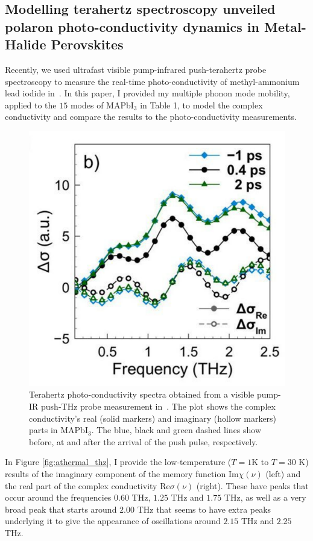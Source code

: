 \subsection{Modelling terahertz spectroscopy unveiled polaron photo-conductivity dynamics in Metal-Halide Perovskites}

Recently, we used ultrafast visible pump-infrared push-terahertz probe spectroscopy to measure the real-time photo-conductivity of methyl-ammonium lead iodide in~\cite{zheng_multipulse_2021}. In this paper, I provided my multiple phonon mode mobility, applied to the $15$ modes of MAPbI$_3$ in Table 1, to model the complex conductivity and compare the results to the photo-conductivity measurements. 

\begin{figure}[t]  
    \centering
    \includegraphics[width=.7\textwidth]{figures/thz_plot.pdf}
    
    \caption{Terahertz photo-conductivity spectra obtained from a visible pump-IR push-THz probe measurement in~\cite{zheng_multipulse_2021}. The plot shows the complex conductivity's real (solid markers) and imaginary (hollow markers) parts in MAPbI$_3$. The blue, black and green dashed lines show before, at and after the arrival of the push pulse, respectively.}
    \label{fig:thzplot}
\end{figure}

In Figure \ref{fig:athermal_thz}, I provide the low-temperature ($T = 1$K to $T = 30$ K) results of the imaginary component of the memory function $\text{Im}\chi(\nu)$ (left) and the real part of the complex conductivity $\text{Re}\sigma(\nu)$ (right). These have peaks that occur around the frequencies $0.60$ THz, $1.25$ THz and $1.75$ THz, as well as a very broad peak that starts around $2.00$ THz that seems to have extra peaks underlying it to give the appearance of oscillations around $2.15$ THz and $2.25$ THz. 

